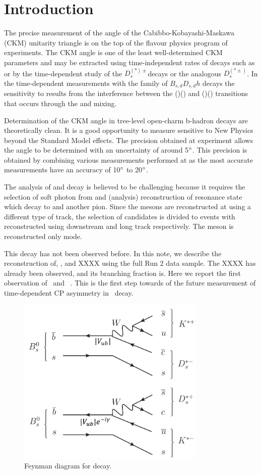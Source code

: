 \section{Introduction}\label{sec::introduction}

The precise measurement of the angle \g of the Cabibbo-Kobayashi-Maskawa (CKM) unitarity triangle is on the top of the flavour physics program of \lhcb experiments. The CKM angle \g is one of the least well-determined CKM parameters and may be extracted using time-independent rates of decays such as \Bp\to\Dzb\Kp or by the time-dependent study of the \Bs\to $D_s^{(*)\pm}$\Kmp decays or the analogous \Bs\to $D_s^{(*\pm)}$\pimp. In the time-dependent measurements with the family of $B_{s,d}$\to$D_{s,d}h$ decays the sensitivity to results from the interference between the \bquark\quarkbar\to(\cquark\quarkbar)(\uquarkbar\quark) and \bquark\quarkbar\to(\uquark\quarkbar)(\cquarkbar\quark) transitions that occurs through the \Bz\Bzb and \Bs\Bsb mixing.

Determination of the CKM angle \g in tree-level open-charm b-hadron decays are theoretically clean. It is a good opportunity to measure sensitive to New Physics beyond the Standard Model effects. The precision obtained at \lhcb experiment allows the angle \g to be determined with an uncertainty of around 5$\degree$. This precision is obtained by combining various measurements performed at \lhcb  as the most accurate measurements have an accuracy of 10$\degree$ to 20$\degree$. 

The analysis of  \Bs\to\Dss\KS\pim and \Bs\to\Dss\Kstarm decay is believed to be challenging because it requires the selection of soft photon from \Dss\to\Ds\g and (\Bs\to\Dss\Kstarm analysis) reconstruction of resonance state \Kstarm which decay to \KS and another pion. Since the \KS mesons are reconstructed at \lhcb using a different type of track, the selection of candidates is divided to events with \KS reconstructed using downstream and long track respectively. The \Ds meson is reconstructed only \Dss\to\Km\Kp\pip mode.

This decay has not been observed before. In this note, we describe the reconstruction of, \Bs\to\Dss\Kstarm, \Bs\to\Dss\KS\pim and XXXX using the full Run 2 data sample. The XXXX has already been observed, and its branching fraction is. Here we report the first observation of \Bs~\to\Dss\KS\pim and \Bs~\to\Dss\Kstarm. This is the first step towards of the future measurement of time-dependent CP asymmetry in \Bs~\to\Dss\Kstarm decay.

\begin{figure}[h]
\includegraphics[width=9cm]{figs/feynman_diagram.png}
\centering
\caption{Feynman diagram for \Bs\to\Dss\Kstarm decay. }
\label{fig:feymnan}
\end{figure}

